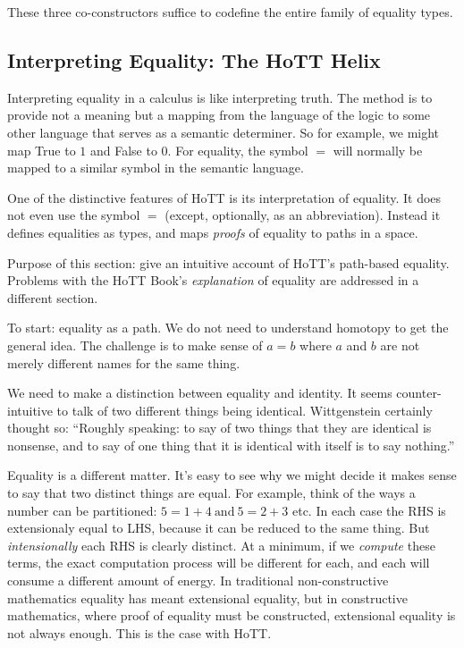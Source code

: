\documentclass{article}
\begin{document}
These three co-constructors suffice to codefine the entire family of
equality types.

\subsection{Interpreting Equality: The HoTT Helix}

Interpreting equality in a calculus is like interpreting truth. The
method is to provide not a meaning but a mapping from the language of
the logic to some other language that serves as a semantic determiner.
So for example, we might map \textsf{True} to \(1\) and \textsf{False}
to 0. For equality, the symbol \(=\) will normally be mapped to a
similar symbol in the semantic language.

One of the distinctive features of HoTT is its interpretation of
equality. It does not even use the symbol \(=\) (except, optionally,
as an abbreviation). Instead it defines equalities as types, and maps
\textit{proofs} of equality to paths in a space.

Purpose of this section: give an intuitive account of HoTT's
path-based equality. Problems with the HoTT Book's
\textit{explanation} of equality are addressed in a different section.

To start: equality as a path. We do not need to understand homotopy to
get the general idea. The challenge is to make sense of \(a=b\) where
\(a\) and \(b\) are not merely different names for the same thing.

We need to make a distinction between equality and identity. It seems
counter-intuitive to talk of two different things being identical.
Wittgenstein certainly thought so: \enquote{Roughly speaking: to say
  of two things that they are identical is nonsense, and to say of one
  thing that it is identical with itself is to say nothing.}

Equality is a different matter. It's easy to see why we might decide
it makes sense to say that two distinct things are equal. For example,
think of the ways a number can be partitioned:
\(5=1+4\ \text{and}\ 5=2+3\) etc. In each case the RHS
is extensionaly equal to LHS, because it can be reduced to the same
thing. But \textit{intensionally} each RHS is clearly distinct. At a
minimum, if we \textit{compute} these terms, the exact computation
process will be different for each, and each will consume a different
amount of energy. In traditional non-constructive mathematics equality
has meant extensional equality, but in constructive mathematics, where
proof of equality must be constructed, extensional equality is not
always enough. This is the case with HoTT.
\end{document}

